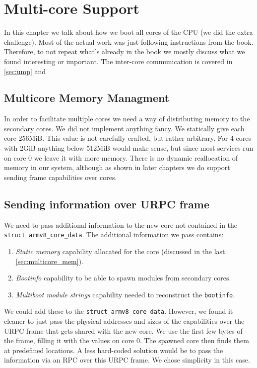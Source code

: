 \chapter{Multi-core Support}
In this chapter we talk about how we boot all cores of the CPU (we did the extra challenge). Most of the actual work was just following instructions from the book. Therefore, to not repeat what's already in the book we mostly discuss what we found interesting or important. The inter-core communication is covered in \autoref{sec:ump} and 

\section{Multicore Memory Managment}
\label{sec:multicore_mem}
In order to facilitate multiple cores we need a way of distributing memory to the secondary cores. We did not implement anything fancy. We statically give each core 256MiB. This value is not carefully crafted, but rather arbitrary. For 4 cores with 2GiB anything below 512MiB would make sense, but since most services run on core 0 we leave it with more memory. There is no dynamic reallocation of memory in our system, although as shown in later chapters we do support sending frame capabilities over cores.

\section{Sending information over URPC frame}
We need to pass additional information to the new core not contained in the \texttt{struct armv8_core_data}. The additional information we pass contains:
\begin{enumerate}
    \item \emph{Static memory} capability allocated for the core (discussed in the last \autoref{sec:multicore_mem}).
    \item \emph{Bootinfo} capability to be able to spawn modules from secondary cores.
    \item \emph{Multiboot module strings} capability needed to reconstruct the \texttt{bootinfo}.
\end{enumerate}

We could add these to the \texttt{struct armv8_core_data}. However, we found it cleaner to just pass the physical addresses and sizes of the capabilities over the URPC frame that gets shared with the new core. We use the first few bytes of the frame, filling it with the values on core 0. The spawned core then finds them at predefined locations. A less hard-coded solution would be to pass the information via an RPC over this URPC frame. We chose simplicity in this case.


